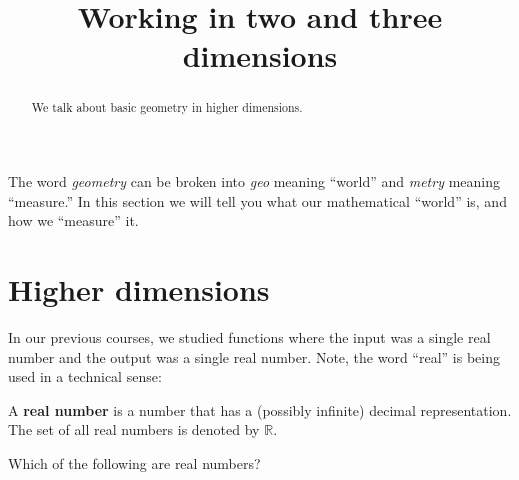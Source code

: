 \documentclass{ximera}
\title[Dig-In:]{Working in two and three dimensions}
\begin{document}
\begin{abstract}
  We talk about basic geometry in higher dimensions.
\end{abstract}
\maketitle


The word \textit{geometry} can be broken into \textit{geo} meaning
``world'' and \textit{metry} meaning ``measure.'' In this section we
will tell you what our mathematical ``world'' is, and how we ``measure''
it.

\section{Higher dimensions}

In our previous courses, we studied functions where the input was a
single real number and the output was a single real number. Note, the
word ``real'' is being used in a technical sense:

\begin{definition}
  A \textbf{real number} is a number that has a (possibly infinite)
  decimal representation. The set of all real numbers is denoted by
  $\mathbb{R}$.
\end{definition}
\begin{question}
  Which of the following are real numbers?
  \begin{selectAll}
    \choice[correct]{$\pi$}
    \choice{$\infty$}
  \end{selectAll}
\end{question}
\end{document}
